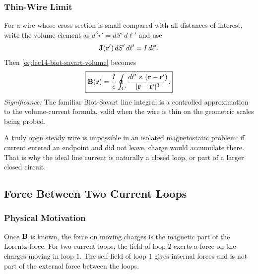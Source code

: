 \subsubsection*{Thin-Wire Limit}
For a wire whose cross-section is small compared with all distances of interest, write
the volume element as $d^3r'=dS'\,d\ell'$ and use
\begin{equation}\label{eq:lec14-current-line-replacement}
  \mathbf{J}(\mathbf{r}')\,dS'\,d\ell' = I\,d\mathbf{\ell}' .
\end{equation}
Then \eqref{eq:lec14-biot-savart-volume} becomes
\begin{equation}\label{eq:lec14-biot-savart-line}
  \boxed{
    \mathbf{B}(\mathbf{r})=\frac{I}{c}\oint_C
    \frac{d\mathbf{\ell}'\times(\mathbf{r}-\mathbf{r}')}{|\mathbf{r}-\mathbf{r}'|^3}.
  }
\end{equation}
\textit{Significance:} The familiar Biot-Savart line integral is a controlled
approximation to the volume-current formula, valid when the wire is thin on the
geometric scales being probed.

\begin{remark}
  A truly open steady wire is impossible in an isolated magnetostatic problem: if
  current entered an endpoint and did not leave, charge would accumulate there.
  That is why the ideal line current is naturally a closed loop, or part of a larger
  closed circuit.
\end{remark}

\subsection{Force Between Two Current Loops}\label{subsec:lec14-loop-force}

\subsubsection*{Physical Motivation}
Once $\mathbf{B}$ is known, the force on moving charges is the magnetic part of the Lorentz
force.  For two current loops, the field of loop $2$ exerts a force on the charges
moving in loop $1$.  The self-field of loop $1$ gives internal forces and is not part
of the external force between the loops.

